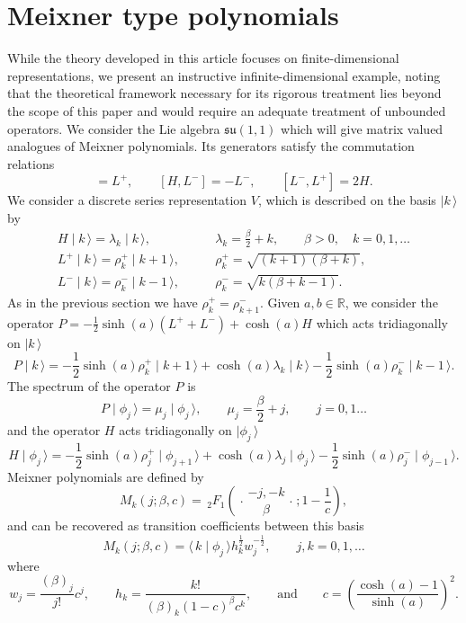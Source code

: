 \documentclass[a4paper,reqno]{amsart}
\newcommand{\rFs}[5]{\,_{#1}F_{#2} \left( \genfrac{.}{.}{0pt}{}{#3}{#4};#5 \right)}
\theoremstyle{definition}
\numberwithin{equation}{section}
\newcommand{\bra}[1]{\langle\,{#1}}
\newcommand{\ket}[1]{\mid{#1}\,\rangle}
\begin{document}
\section{Meixner type polynomials}
While the theory developed in this article focuses on finite-dimensional representations, we present an instructive infinite-dimensional example, noting that the theoretical framework necessary for its rigorous treatment lies beyond the scope of this paper and would require an adequate treatment of unbounded operators. We consider the Lie algebra $\mathfrak{su}(1,1)$ which will give matrix valued analogues of Meixner polynomials. Its generators satisfy the commutation relations
\begin{equation}
    [H,L^+]=L^+, \qquad [H,L^-]=-L^-, \qquad [L^-,L^+]=2H.
\end{equation}
We consider a discrete series representation $V$, which is described on the basis $\ket{k}$ by
\begin{align}
H \ket{k}=\lambda_k\ket{k},&\qquad \lambda_k=\frac{\beta}{2}+k, \qquad \beta>0,\quad k=0,1,\ldots \\
L^{+} \ket{k}=\rho^+_k\ket{k+1},&\qquad \rho^+_k=\sqrt{(k+1)(\beta+k)},\\
L^{-} \ket{k}=\rho^-_k\ket{k-1},&\qquad \rho^-_k=\sqrt{k(\beta+k-1)}.
\end{align}
As in the previous section we have $\rho^+_k=\rho_{k+1}^-.$ Given $a,b\in\mathbb{R}$, we consider the operator $P=-\frac{1}{2}\sinh(a)(L^++L^-)+\cosh(a)H$ which acts tridiagonally on $\ket{k}$
\begin{equation}
    P\ket{k}=-\frac{1}{2}\sinh(a) \rho_k^+ \ket{k+1}+\cosh(a) \lambda_k\ket{k}-\frac{1}{2}\sinh(a)\rho_k^-\ket{k-1}.
\end{equation}
The spectrum of the operator $P$ is 
\begin{equation}
\label{eq:spectrum-P-meixner}
P\ket{\phi_j}=\mu_j\ket{\phi_j},\qquad \mu_j=\frac{\beta}{2}+j,\qquad j=0,1\ldots
\end{equation}
and the operator $H$ acts tridiagonally on $\ket{\phi_j}$
\begin{equation}
    H\ket{\phi_j}=-\frac{1}{2}\sinh(a)\rho^+_j\ket{\phi_{j+1}}+\cosh(a)\lambda_j\ket{\phi_j}-\frac{1}{2}\sinh(a)\rho_j^-\ket{\phi_{j-1}}.
\end{equation}
Meixner polynomials are defined by
\begin{equation}
M_{k}(j;\beta,c)=\rFs{2}{1}{-j,-k}{\beta}{1-\frac{1}{c}},
\end{equation}
and can be recovered as transition coefficients between this basis
\begin{equation}
    M_{k}(j;\beta,c)=\bra{k}\ket{\phi_j}h_k^\frac{1}{2}w_j^{-\frac{1}{2}},\qquad  j,k=0,1,\ldots
\end{equation} 
where
\begin{equation}
\label{eq:weight-norm-scalar-meixner}
w_j=\frac{(\beta)_j}{j!}c^j, \qquad h_k=\frac{k!}{(\beta)_k(1-c)^{\beta} c^k},\qquad \text{and}\qquad c=\left(\frac{\cosh(a)-1}{\sinh(a)}\right)^2.
\end{equation}
\end{document}
